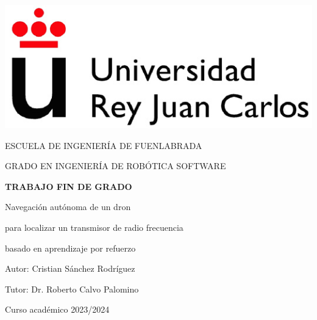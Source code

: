 \thispagestyle{empty}

\begin{titlepage}
	\begin{center}
		\vspace*{3mm}
		\begin{center}
			\includegraphics[width=0.4\linewidth]{imagenes/cap1/logo_urjc}
		\end{center}
		\vspace{6.0mm}
		
		\fontsize{15.5}{14}\selectfont ESCUELA DE INGENIERÍA DE FUENLABRADA
		\vspace{13mm}
		
		\fontsize{14}{14}\selectfont GRADO EN INGENIERÍA DE ROBÓTICA SOFTWARE
		
		\vspace{70pt}
		
		\fontsize{15.7}{14}\selectfont \textbf{TRABAJO FIN DE GRADO} 
		
		\vspace{20mm}
		\begin{LARGE}
			Navegación autónoma de un dron

			para localizar un transmisor de radio frecuencia
			
			basado en aprendizaje por refuerzo
		\end{LARGE}
		
		\vspace{20mm}
		
		\begin{large}
			Autor: Cristian Sánchez Rodríguez
			
			Tutor: Dr. Roberto Calvo Palomino
			
			\vspace{10mm}
		\end{large}
		\begin{normalsize}
			Curso académico 2023/2024		
		\end{normalsize}
		\vspace{10mm}
		
	\end{center}
	
\end{titlepage}

\thispagestyle{empty}

